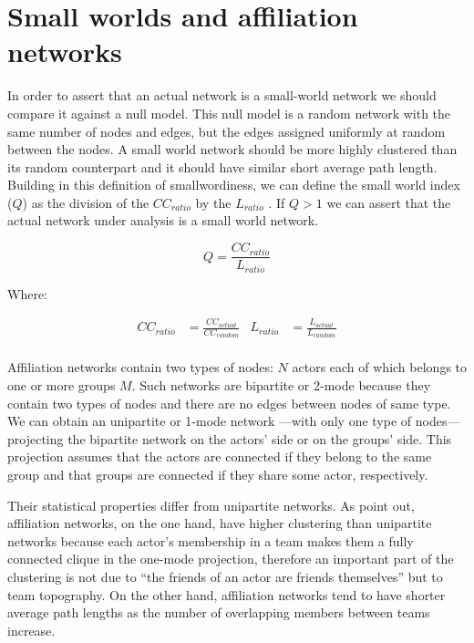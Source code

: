 \chapter{Small worlds and affiliation networks}
\label{sw-affnets}

In order to assert that an actual network is a small-world network we should compare it against a null model. This null model is a random network with the same number of nodes and edges, but the edges assigned uniformly at random between the nodes. A small world network should be more highly clustered than its random counterpart and it should have similar short average path length. Building in this definition of smallwordiness, we can define the small world index ($Q$) as the division of the $CC_{ratio}$ by the $L_{ratio}$ \citep{watts:1999b,davis:2003,uzzi:2005,uzzi:2007}. If $Q > 1$ we can assert that the actual network under analysis is a small world network.

\begin{equation}
Q = \frac{CC_{ratio}}{L_{ratio}}
\end{equation}

Where:

\begin{align}
CC_{ratio}& = \frac{CC_{actual}}{CC_{random}} &
L_{ratio}& = \frac{L_{actual}}{L_{random}} \nonumber \\
\end{align}

Affiliation networks contain two types of nodes: $N$ actors each of which belongs to one or more groups $M$. Such networks are bipartite or 2-mode because they contain two types of nodes and there are no edges between nodes of same type. We can obtain an unipartite or 1-mode network ---with only one type of nodes--- projecting the bipartite network on the actors' side or on the groups' side. This projection assumes that the actors are connected if they belong to the same group and that groups are connected if they share some actor, respectively.

Their statistical properties differ from unipartite networks. As \citet[83]{uzzi:2007} point out, affiliation networks, on the one hand, have higher clustering than unipartite networks because each actor's membership in a team makes them a fully connected clique in the one-mode projection, therefore an important part of the clustering is not due to ``the friends of an actor are friends themselves'' but to team topography. On the other hand, affiliation networks tend to have shorter average path lengths as the number of overlapping members between teams increase.

